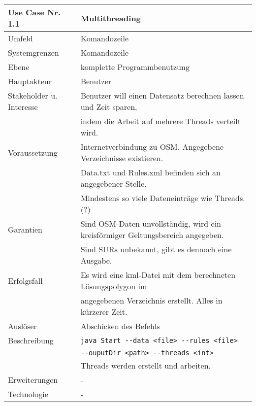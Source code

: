 \begin{tabular}{| l | l |}
 \hline
 \textbf{Use Case Nr. 1.1} & Multithreading\\
 \hline
 Umfeld & Komandozeile\\
 \hline
 Systemgrenzen & Komandozeile\\
 \hline
 Ebene & komplette Programmbenutzung\\
 \hline
 Hauptakteur & Benutzer\\
 \hline
 Stakeholder u. Interesse & Benutzer will einen Datensatz berechnen lassen und Zeit sparen,\\
			  & indem die Arbeit auf mehrere Threads verteilt wird.\\
 \hline
 Voraussetzung & Internetverbindung zu OSM. Angegebene Verzeichnisse existieren.\\
	      & Data.txt und Rules.xml befinden sich an angegebener Stelle. \\
	      & Mindestens so viele Dateneinträge wie Threads. (?)\\
 \hline
 Garantien & Sind OSM-Daten unvollständig, wird ein kreisförmiger Geltungsbereich angegeben.\\
	  & Sind SURs unbekannt, gibt es dennoch eine Ausgabe.\\
 \hline
 Erfolgsfall & Es wird eine kml-Datei mit dem berechneten Lösungspolygon im\\
	    & angegebenen Verzeichnis erstellt. Alles in kürzerer Zeit.\\
 \hline
 Auslöser & Abschicken des Befehls\\
 \hline
 Beschreibung & \verb|java Start --data <file> --rules <file>|\\
	      & \hspace{24pt}\verb|--ouputDir <path> --threads <int>|\\
	      & Threads werden erstellt und arbeiten.\\
 \hline
 Erweiterungen & -\\
 \hline
 Technologie & -\\
 \hline
\end{tabular}
\\[12pt]

